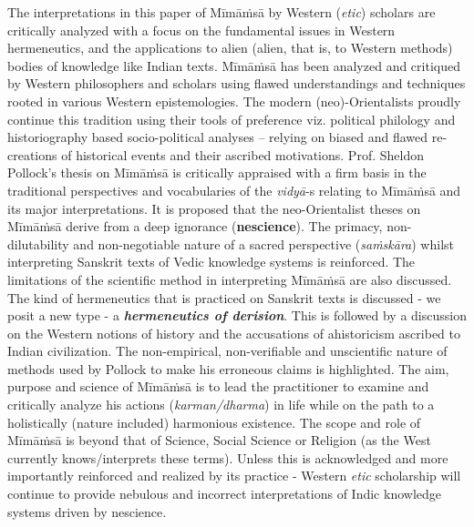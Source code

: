 The interpretations in this paper of Mīmāṁsā by Western (\textit{etic}) scholars are critically analyzed with a focus on the fundamental issues in Western hermeneutics, and the applications to alien (alien, that is, to Western methods) bodies of knowledge like Indian texts. Mīmāṁsā has been analyzed and critiqued by Western philosophers and scholars using flawed understandings and techniques rooted in various Western epistemologies. The modern (neo)-Orientalists proudly continue this tradition using their tools of preference viz. political philology and historiography based socio-political analyses – relying on biased and flawed re-creations of historical events and their ascribed motivations. Prof. Sheldon Pollock's thesis on Mīmāṁsā is critically appraised with a firm basis in the traditional perspectives and vocabularies of the \textit{vidyā}-s relating to Mīmāṁsā and its major interpretations. It is proposed that the neo-Orientalist theses on Mīmāṁsā derive from a deep ignorance (\textbf{nescience}). The primacy, non-dilutability and non-negotiable nature of a sacred perspective (\textit{saṁskāra}) whilst interpreting Sanskrit texts of Vedic knowledge systems is reinforced. The limitations of the scientific method in interpreting Mīmāṁsā are also discussed. The kind of hermeneutics that is practiced on Sanskrit texts is discussed - we posit a new type - a \textbf{\textit{hermeneutics of derision}}. This is followed by a discussion on the Western notions of history and the accusations of ahistoricism ascribed to Indian civilization. The non-empirical, non-verifiable and unscientific nature of methods used by Pollock to make his erroneous claims is highlighted. The aim, purpose and science of Mīmāṁsā is to lead the practitioner to examine and critically analyze his actions (\textit{karman/dharma}) in life while on the path to a holistically (nature included) harmonious existence. The scope and role of Mīmāṁsā is beyond that of Science, Social Science or Religion (as the West currently knows/interprets these terms). Unless this is acknowledged and more importantly reinforced and realized by its practice - Western \textit{etic} scholarship will continue to provide nebulous and incorrect interpretations of Indic knowledge systems driven by nescience.


